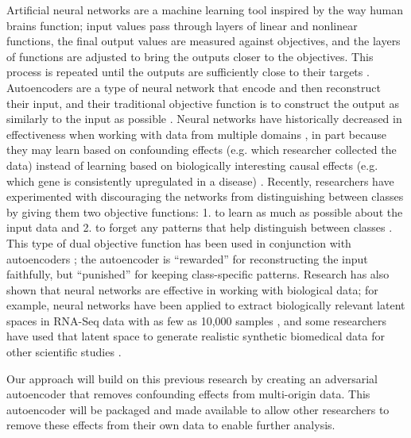 \documentclass[notitlepage]{article}
\begin{document}
Artificial neural networks are a machine learning tool inspired by the way human brains function; input values pass through layers of linear and nonlinear functions, the final output values are measured against objectives, and the layers of functions are adjusted to bring the outputs closer to the objectives.
This process is repeated until the outputs are sufficiently close to their targets \citep{schmidhuber_deep_2015}.
Autoencoders are a type of neural network that encode and then reconstruct their input, and their traditional objective function is to construct the output as similarly to the input as possible \citep{hinton_reducing_2006}.
Neural networks have historically decreased in effectiveness when working with data from multiple domains \citep{ganin_domain-adversarial_2015}, in part because they may learn based on confounding effects (e.g. which researcher collected the data) instead of learning based on biologically interesting causal effects (e.g. which gene is consistently upregulated in a disease) \citep{louizos_causal_2017}.
Recently, researchers have experimented with discouraging the networks from distinguishing between classes by giving them two objective functions:
1. to learn as much as possible about the input data and
2. to forget any patterns that help distinguish between classes \citep{ganin_domain-adversarial_2015,tzeng_deep_2014}.
This type of dual objective function has been used in conjunction with autoencoders \citep{louizos_variational_2015}; the autoencoder is ``rewarded'' for reconstructing the input faithfully, but ``punished'' for keeping class-specific patterns.
Research has also shown that neural networks are effective in working with biological data; for example, neural networks have been applied to extract biologically relevant latent spaces in RNA-Seq data with as few as 10,000 samples \citep{way_extracting_2017}, and some researchers have used that latent space to generate realistic synthetic biomedical data for other scientific studies \citep{beaulieu-jones_privacy-preserving_2017}.

Our approach will build on this previous research by creating an adversarial autoencoder that removes confounding effects from multi-origin data.
This autoencoder will be packaged and made available to allow other researchers to remove these effects from their own data to enable further analysis.
\end{document}
